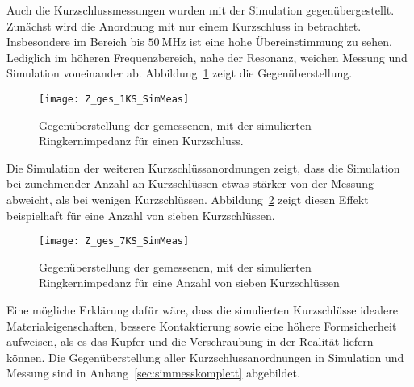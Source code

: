 \par
Auch die Kurzschlussmessungen wurden mit der Simulation gegen\"ubergestellt. Zun\"achst wird die Anordnung mit nur einem Kurzschluss in betrachtet. Insbesondere im Bereich bis $\SI{50}{\mega\hertz}$ ist eine hohe \"Ubereinstimmung zu sehen. Lediglich im h\"oheren Frequenzbereich, nahe der Resonanz, weichen Messung und Simulation voneinander ab. Abbildung~\ref{fig:boxpolycrossrk1ks} zeigt die Gegen\"uberstellung.
\begin{figure}[htb]
	\centering
	\texttt{[image: Z\_ges\_1KS\_SimMeas]}
	\caption{Gegen\"uberstellung der gemessenen, mit der simulierten Ringkernimpedanz f\"ur einen Kurzschluss.}
	\label{fig:boxpolycrossrk1ks}
\end{figure}



\newpage



Die Simulation der weiteren Kurzschl\"ussanordnungen zeigt, dass die Simulation bei zunehmender Anzahl an Kurzschl\"ussen etwas st\"arker von der Messung abweicht, als bei wenigen Kurzschl\"ussen. Abbildung~\ref{fig:boxpolycrossrk7ks} zeigt diesen Effekt beispielhaft f\"ur eine Anzahl von sieben Kurzschl\"ussen.
\begin{figure}[htb]
	\centering
	\texttt{[image: Z\_ges\_7KS\_SimMeas]}
	\caption{Gegen\"uberstellung der gemessenen, mit der simulierten Ringkernimpedanz f\"ur eine Anzahl von sieben Kurzschl\"ussen}
	\label{fig:boxpolycrossrk7ks}
\end{figure}
\par
Eine m\"ogliche Erkl\"arung daf\"ur w\"are, dass die simulierten Kurzschl\"usse idealere Materialeigenschaften, bessere Kontaktierung sowie eine h\"ohere Formsicherheit aufweisen, als es das Kupfer und die Verschraubung in der Realit\"at liefern k\"onnen. Die Gegen\"uberstellung aller Kurzschlussanordnungen in Simulation und Messung sind in Anhang~\ref{sec:simmesskomplett} abgebildet.


